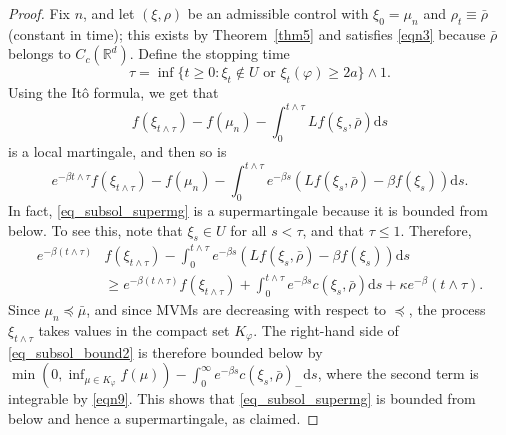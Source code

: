 \documentclass{article}
\theoremstyle{definition}
\numberwithin{equation}{section}
\numberwithin{theorem}{section}
\newcommand{\R}{\mathbb{R}}
\newcommand{\ds}{\mathrm{d}s}
\newcommand{\Pcal}{{\mathcal P}}
\begin{document}
\begin{proof}
%




Fix $n$, and let $(\xi,\rho)$ be an admissible control with $\xi_0=\mu_n$ and $\rho_t\equiv\bar\rho$ (constant in time); this exists by Theorem~\ref{thm5} and satisfies \eqref{eqn3} because $\bar\rho$ belongs to $C_c({\R^d})$. Define the stopping time
\[
\tau = \inf\{ t\ge0\colon \text{$\xi_t \notin U$ or $\xi_t(\varphi) \ge 2a$}\} \wedge 1.
\]
Using the It\^o formula, we get that
\[
f(\xi_{t\wedge\tau}) - f(\mu_n) - \int_0^{t\wedge\tau} Lf(\xi_s,\bar\rho) \ds
\]
is a local martingale, and then so is
\begin{equation}\label{eq_subsol_supermg}
e^{-\beta t\wedge\tau} f(\xi_{t\wedge\tau}) - f(\mu_n) - \int_0^{t\wedge\tau} e^{-\beta s} ( Lf(\xi_s,\bar\rho) - \beta f(\xi_s)) \ds.
\end{equation}
In fact, \eqref{eq_subsol_supermg} is a supermartingale because it is bounded from below. To see this, note that $\xi_s \in U$ for all $s<\tau$, and that $\tau\le 1$. Therefore,
\begin{equation}\label{eq_subsol_bound2}
\begin{aligned}
e^{-\beta (t\wedge\tau)} & f(\xi_{t\wedge\tau})  - \int_0^{t\wedge\tau} e^{-\beta s} ( Lf(\xi_s,\bar\rho) - \beta f(\xi_s)) \ds \\
&\ge e^{-\beta ( t\wedge\tau)} f(\xi_{t\wedge\tau}) + \int_0^{t\wedge\tau} e^{-\beta s}c(\xi_s,\bar\rho) \ds + \kappa e^{-\beta} (t\wedge\tau).
\end{aligned}
\end{equation}
Since $\mu_n\preceq\bar\mu$, and since MVMs are decreasing with respect to $\preceq$, the process $\xi_{t\wedge\tau}$ takes values in the compact set $K_\varphi$. The right-hand side of \eqref{eq_subsol_bound2} is therefore bounded below by $\min(0,\inf_{\mu\in K_\varphi} f(\mu)) - \int_0^\infty e^{-\beta s} c(\xi_s,\bar{\rho})_- \ds$, where the second term is integrable by \eqref{eqn9}. This shows that \eqref{eq_subsol_supermg} is bounded from below and hence a supermartingale, as claimed.



\end{proof}
\end{document}

